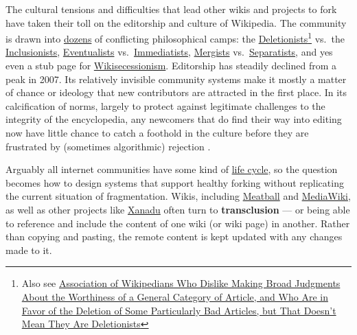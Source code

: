 \documentclass[10pt]{article}
\begin{document}
\begin{multicols}{2}
The cultural tensions and difficulties that lead other wikis and
projects to fork have taken their toll on the editorship and culture of
Wikipedia. The community is drawn into
\href{https://meta.wikimedia.org/wiki/Conflicting_Wikipedia_philosophies}{dozens}
of conflicting philosophical camps: the
\href{https://meta.wikimedia.org/wiki/Special:MyLanguage/Deletionism}{Deletionists}\footnote{Also
  see
  \href{https://meta.wikimedia.org/wiki/Association_of_Wikipedians_Who_Dislike_Making_Broad_Judgments_About_the_Worthiness_of_a_General_Category_of_Article,_and_Who_Are_in_Favor_of_the_Deletion_of_Some_Particularly_Bad_Articles,_but_That_Doesn\%27t_Mean_They_Are_Deletionists}{Association
  of Wikipedians Who Dislike Making Broad Judgments About the Worthiness
  of a General Category of Article, and Who Are in Favor of the Deletion
  of Some Particularly Bad Articles, but That Doesn't Mean They Are
  Deletionists}} vs.~the
\href{https://meta.wikimedia.org/wiki/Special:MyLanguage/Inclusionism}{Inclusionists},
\href{https://meta.wikimedia.org/wiki/Eventualism}{Eventualists}
vs.~\href{https://meta.wikimedia.org/wiki/Immediatism}{Immediatists},
\href{https://meta.wikimedia.org/wiki/Special:MyLanguage/Mergism}{Mergists}
vs.~\href{https://meta.wikimedia.org/wiki/Special:MyLanguage/Separatism}{Separatists},
and yes even a stub page for
\href{https://meta.wikimedia.org/wiki/Wikisecessionism}{Wikisecessionism}.
Editorship has steadily declined from a peak in 2007. Its relatively
invisible community systems make it mostly a matter of chance or
ideology that new contributors are attracted in the first place. In its
calcification of norms, largely to protect against legitimate challenges
to the integrity of the encyclopedia, any newcomers that do find their
way into editing now have little chance to catch a foothold in the
culture before they are frustrated by (sometimes algorithmic) rejection
\cite{hillWikipediaEndOpen2019, halfakerRiseDeclineOpen2013} .

Arguably all internet communities have some kind of
\href{http://meatballwiki.org/wiki/WikiLifeCycle}{life cycle}, so the
question becomes how to design systems that support healthy forking
without replicating the current situation of fragmentation. Wikis,
including \href{http://www.meatballwiki.org/wiki/TransClusion}{Meatball}
and
\href{https://www.mediawiki.org/wiki/Extension:Interwiki}{MediaWiki}, as
well as other projects like
\href{https://en.wikipedia.org/wiki/Project_Xanadu}{Xanadu} often turn
to \textbf{transclusion} --- or being able to reference and include the
content of one wiki (or wiki page) in another. Rather than copying and
pasting, the remote content is kept updated with any changes made to it.


\end{multicols}
\end{document}
